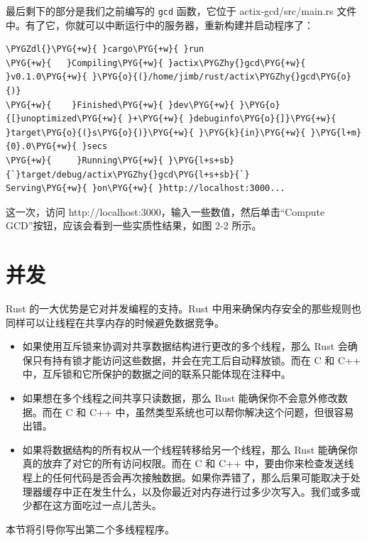 最后剩下的部分是我们之前编写的 \texttt{gcd} 函数，它位于 actix-gcd/\allowbreak{}src/\allowbreak{}main.rs 文件中。有了它，你就可以中断运行中的服务器，重新构建并启动程序了：

\begin{Verbatim}[commandchars=\\\{\},breaklines=true,breakanywhere=true,fontsize=\codefont,xleftmargin=17bp]
\PYGZdl{}\PYG{+w}{ }cargo\PYG{+w}{ }run
\PYG{+w}{   }Compiling\PYG{+w}{ }actix\PYGZhy{}gcd\PYG{+w}{ }v0.1.0\PYG{+w}{ }\PYG{o}{(}/home/jimb/rust/actix\PYGZhy{}gcd\PYG{o}{)}
\PYG{+w}{    }Finished\PYG{+w}{ }dev\PYG{+w}{ }\PYG{o}{[}unoptimized\PYG{+w}{ }+\PYG{+w}{ }debuginfo\PYG{o}{]}\PYG{+w}{ }target\PYG{o}{(}s\PYG{o}{)}\PYG{+w}{ }\PYG{k}{in}\PYG{+w}{ }\PYG{l+m}{0}.0\PYG{+w}{ }secs
\PYG{+w}{     }Running\PYG{+w}{ }\PYG{l+s+sb}{`}target/debug/actix\PYGZhy{}gcd\PYG{l+s+sb}{`}
Serving\PYG{+w}{ }on\PYG{+w}{ }http://localhost:3000...
\end{Verbatim}

这一次，访问 http://localhost:3000，输入一些数值，然后单击“Compute GCD”按钮，应该会看到一些实质性结果，如图 2-2 所示。


\section{并发}

Rust 的一大优势是它对并发编程的支持。Rust 中用来确保内存安全的那些规则也同样可以让线程在共享内存的时候避免数据竞争。

\begin{itemize}
\item 如果使用互斥锁来协调对共享数据结构进行更改的多个线程，那么 Rust 会确保只有持有锁才能访问这些数据，并会在完工后自动释放锁。而在 C 和 C++ 中，互斥锁和它所保护的数据之间的联系只能体现在注释中。
\item 如果想在多个线程之间共享只读数据，那么 Rust 能确保你不会意外修改数据。而在 C 和 C++ 中，虽然类型系统也可以帮你解决这个问题，但很容易出错。
\item 如果将数据结构的所有权从一个线程转移给另一个线程，那么 Rust 能确保你真的放弃了对它的所有访问权限。而在 C 和 C++ 中，要由你来检查发送线程上的任何代码是否会再次接触数据。如果你弄错了，那么后果可能取决于处理器缓存中正在发生什么，以及你最近对内存进行过多少次写入。我们或多或少都在这方面吃过一点儿苦头。
\end{itemize}

本节将引导你写出第二个多线程程序。

